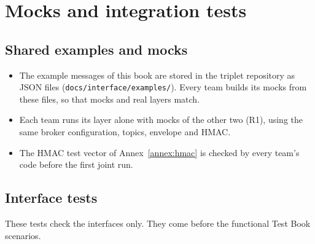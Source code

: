 \documentclass[11pt,a4paper]{article}
\newcommand{\code}[1]{\texttt{#1}}
\begin{document}
\section{Mocks and integration tests}

\subsection{Shared examples and mocks}
\begin{itemize}
  \item The example messages of this book are stored in the triplet repository as JSON files (\code{docs/\allowbreak interface/\allowbreak examples/\allowbreak }). Every team builds its mocks from these files, so that mocks and real layers match.
  \item Each team runs its layer alone with mocks of the other two (R1), using the same broker configuration, topics, envelope and HMAC.
  \item The HMAC test vector of Annex~\ref{annex:hmac} is checked by every team's code before the first joint run.
\end{itemize}

\subsection{Interface tests}

These tests check the interfaces only. They come before the functional Test Book scenarios.
\end{document}
